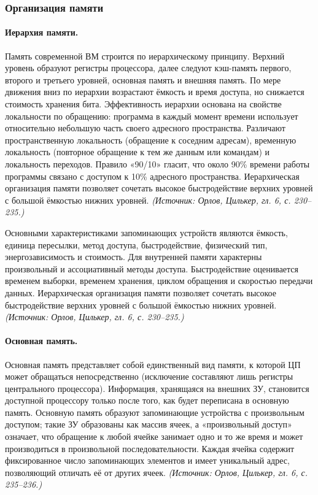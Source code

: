 \documentclass[a4paper,12pt]{article}
\begin{document}
\subsubsection{Организация памяти}

\paragraph{Иерархия памяти.}
Память современной ВМ строится по иерархическому принципу. Верхний уровень образуют регистры процессора, далее следуют кэш-память первого, второго и третьего уровней, основная память и внешняя память. По мере движения вниз по иерархии возрастают ёмкость и время доступа, но снижается стоимость хранения бита. Эффективность иерархии основана на свойстве локальности по обращению: программа в каждый момент времени использует относительно небольшую часть своего адресного пространства. Различают пространственную локальность (обращение к соседним адресам), временную локальность (повторное обращение к тем же данным или командам) и локальность переходов. Правило «90/10» гласит, что около 90\% времени работы программы связано с доступом к 10\% адресного пространства. Иерархическая организация памяти позволяет сочетать высокое быстродействие верхних уровней с большой ёмкостью нижних уровней.
\textit{(Источник: Орлов, Цилькер, гл. 6, с. 230--235.)}

Основными характеристиками запоминающих устройств являются ёмкость, единица пересылки, метод доступа, быстродействие, физический тип, энергозависимость и стоимость. Для внутренней памяти характерны произвольный и ассоциативный методы доступа. Быстродействие оценивается временем выборки, временем хранения, циклом обращения и скоростью передачи данных. Иерархическая организация памяти позволяет сочетать высокое быстродействие верхних уровней с большой ёмкостью нижних уровней.
\textit{(Источник: Орлов, Цилькер, гл. 6, с. 230--235.)}

\paragraph{Основная память.}
Основная память представляет собой единственный вид памяти, к которой ЦП может обращаться непосредственно (исключение составляют лишь регистры центрального процессора). Информация, хранящаяся на внешних ЗУ, становится доступной процессору только после того, как будет переписана в основную память. Основную память образуют запоминающие устройства с произвольным доступом; такие ЗУ образованы как массив ячеек, а «произвольный доступ» означает, что обращение к любой ячейке занимает одно и то же время и может производиться в произвольной последовательности. Каждая ячейка содержит фиксированное число запоминающих элементов и имеет уникальный адрес, позволяющий отличать её от других ячеек.
\textit{(Источник: Орлов, Цилькер, гл. 6, с. 235--236.)}
\end{document}
